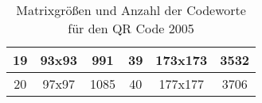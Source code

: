 \begin{appendix}
\begin{table}[htbp]
\begin{tabular}{|c|c|c|c|c|c|}
			19               & 93x93                                                            & 991                                                                          & 39               & 173x173                                                          & 3532                                                                          \\ \hline
			20               & 97x97                                                            & 1085                                                                         & 40               & 177x177                                                          & 3706                                                                          \\ \hline
		\end{tabular}
		\caption[Matrixgrößen und Anzahl der Codeworte für den QR Code 2005]{Matrixgrößen und Anzahl der Codeworte für den QR Code 2005\footnotemark}
		\label{tab:matrixwidth}
	\end{table}
\pagebreak
	

\end{appendix}
